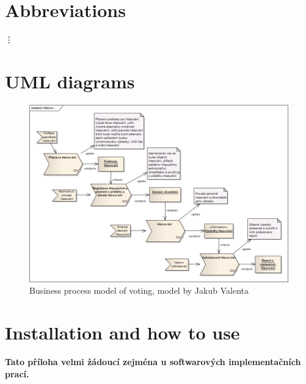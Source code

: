 \documentclass[11pt,twoside,a4paper]{book}
\begin{document}
\appendix



\chapter{Abbreviations}

\begin{description}
\item
\end{description}
\vdots

\chapter{UML diagrams}
\begin{figure}[h]
\begin{center}
\includegraphics[width=14cm]{figures/VotingCZECH}
\caption{Business process model of voting, model by Jakub Valenta}
\label{fig:businessMOD}
\end{center}
\end{figure}

\chapter{Installation and how to use}
\textbf{\large Tato příloha velmi žádoucí zejména u softwarových implementačních prací.}

\end{document}
